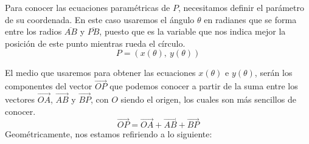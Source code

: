 \documentclass[12pt]{article}
\begin{document}
\begin{figure}[hbt!]
\centering


\end{figure}

Para conocer las ecuaciones paramétricas de $P$, necesitamos definir el parámetro de su coordenada. En este caso usaremos el ángulo $\theta$ en radianes que se forma entre los radios $\overline{AB}$ y $\overline{PB}$, puesto que es la variable que nos indica mejor la posición de este punto mientras rueda el círculo.
\[
  P = (x(\theta), \ y(\theta))
\]

El medio que usaremos para obtener las ecuaciones $x(\theta)$ e $y(\theta)$, serán los componentes del vector $\overrightarrow{OP}$ que podemos conocer a partir de la suma entre los vectores $\overrightarrow{OA}$, $\overrightarrow{AB}$ y $\overrightarrow{BP}$, con $O$ siendo el origen, los cuales son más sencillos de conocer.
\[
  \overrightarrow{OP} = \overrightarrow{OA} + \overrightarrow{AB} + \overrightarrow{BP}
\]
Geométricamente, nos estamos refiriendo a lo siguiente:
\end{document}
